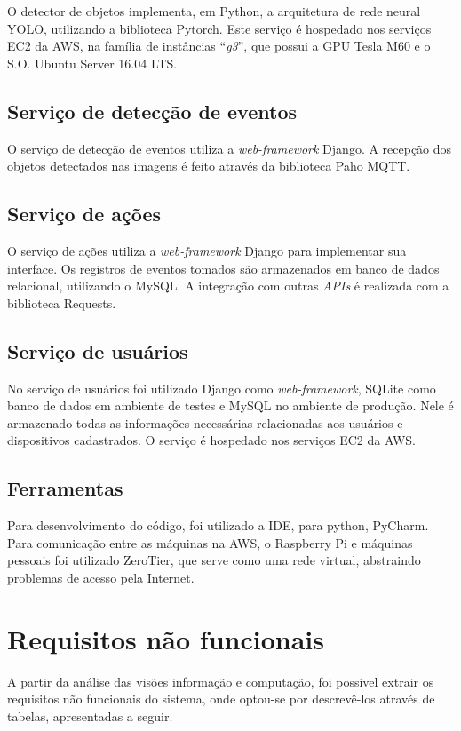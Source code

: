 \documentclass[]{politex}
\begin{document}
O detector de objetos implementa, em Python, a arquitetura de rede neural YOLO, utilizando a biblioteca Pytorch. Este serviço é hospedado nos serviços EC2 da AWS, na família de instâncias “\textit{g3}”, que possui a GPU Tesla M60 e o S.O. Ubuntu Server 16.04 LTS.

\subsection{Serviço de detecção de eventos}
O serviço de detecção de eventos utiliza a \textit{web-framework} Django. A recepção dos objetos detectados nas imagens é feito através da biblioteca Paho MQTT.

\subsection{Serviço de ações}
O serviço de ações utiliza a \textit{web-framework} Django para implementar sua interface. Os registros de eventos tomados são armazenados em banco de dados relacional, utilizando o MySQL. A integração com outras \textit{APIs} é realizada com a biblioteca Requests.

\subsection{Serviço de usuários}
No serviço de usuários foi utilizado Django como \textit{web-framework}, SQLite como banco de dados em ambiente de testes e MySQL no ambiente de produção. Nele é armazenado todas as informações necessárias relacionadas aos usuários e dispositivos cadastrados. O serviço é hospedado nos serviços EC2 da AWS.

\subsection{Ferramentas}
Para desenvolvimento do código, foi utilizado a IDE, para python, PyCharm. Para comunicação entre as máquinas na AWS, o Raspberry Pi e máquinas pessoais foi utilizado ZeroTier, que serve como uma rede virtual, abstraindo problemas de acesso pela Internet.

\section{Requisitos não funcionais}
A partir da análise das visões informação e computação, foi possível extrair os requisitos não funcionais do sistema, onde optou-se por descrevê-los através de tabelas, apresentadas a seguir.
\end{document}
